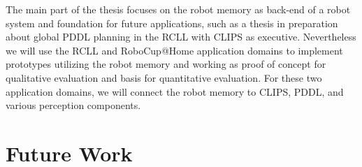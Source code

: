 The main part of the thesis focuses on the robot memory as back-end of
a robot system and foundation for future applications, such as a
thesis in preparation about global PDDL planning in the RCLL with
CLIPS as executive. Nevertheless we will use the RCLL and RoboCup@Home
application domains to implement prototypes utilizing the robot memory
and working as proof of concept for qualitative evaluation and basis
for quantitative evaluation. For these two application domains, we
will connect the robot memory to CLIPS, PDDL, and various perception
components.

\section{Future Work}
\label{sec:future-work}
